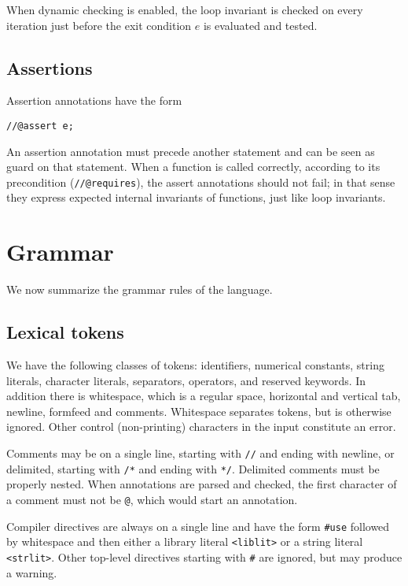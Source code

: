 \documentclass[11pt]{article}
\begin{document}
When dynamic checking is enabled, the loop invariant is checked on
every iteration just before the exit condition $e$ is evaluated and
tested.

\subsection{Assertions}

Assertion annotations have the form
\begin{verbatim}
//@assert e;
\end{verbatim}
An assertion annotation must precede another statement and can be seen
as guard on that statement.  When a function is called correctly,
according to its precondition (\verb'//@requires'), the assert
annotations should not fail; in that sense they express expected
internal invariants of functions, just like loop invariants.

\section{Grammar}

We now summarize the grammar rules of the language.

\subsection{Lexical tokens}

We have the following classes of tokens: identifiers, numerical
constants, string literals, character literals, separators, operators,
and reserved keywords.  In addition there is whitespace, which is
a regular space, horizontal and vertical tab, newline, formfeed
and comments.  Whitespace separates tokens, but is otherwise
ignored.  Other control (non-printing) characters in the input
constitute an error.

Comments may be on a single line, starting with \verb'//'
and ending with newline, or delimited, starting with
\verb'/*' and ending with \verb'*/'.  Delimited comments
must be properly nested.  When annotations are parsed and
checked, the first character of a comment must not be
\verb'@', which would start an annotation.

Compiler directives are always on a single line and have the form
\verb'#use' followed by whitespace and then either a library literal
\verb'<liblit>' or a string literal \verb'<strlit>'.  Other
top-level directives starting with \verb'#' are ignored, but
may produce a warning.
\end{document}
